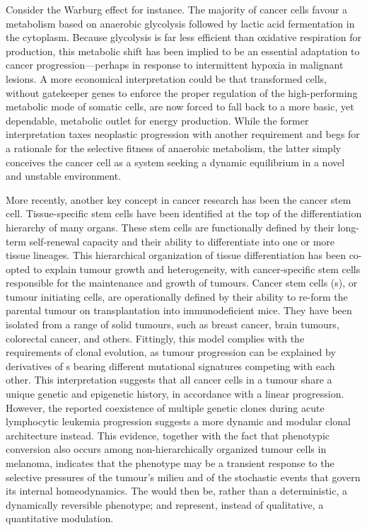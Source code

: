 Consider the Warburg effect\cite{warburg_origin_1956} for instance.  The
majority of cancer cells favour a metabolism based on anaerobic glycolysis
followed by lactic acid fermentation in the cytoplasm.  Because glycolysis is
far less efficient than oxidative respiration for  production,
this metabolic shift has been implied to be an essential adaptation to cancer
progression---perhaps in response to intermittent hypoxia in malignant
lesions.\cite{gatenby_why_2004} A more economical interpretation could be that
transformed cells, without gatekeeper genes to enforce the proper regulation of
the high-performing metabolic mode of somatic cells, are now forced to fall back
to a more basic, yet dependable, metabolic outlet for energy production.  While
the former interpretation taxes neoplastic progression with another requirement
and begs for a rationale for the selective fitness of anaerobic metabolism, the
latter simply conceives the cancer cell as a system seeking a dynamic
equilibrium in a novel and unstable environment.

More recently, another key concept in cancer research has been the cancer stem
cell.  Tissue-specific stem cells have been identified at the top of the
differentiation hierarchy of many organs.  These stem cells are functionally
defined by their long-term self-renewal capacity and their ability to
differentiate into one or more tissue lineages.  This hierarchical organization
of tissue differentiation has been co-opted to explain tumour growth and
heterogeneity, with cancer-specific stem cells responsible for the maintenance
and growth of tumours.  Cancer stem cells (s), or tumour initiating
cells, are operationally defined by their ability to re-form the parental tumour
on transplantation into immunodeficient mice.  They have been isolated from a
range of solid tumours, such as breast cancer, brain tumours, colorectal cancer,
and others.\cite{beck_unravelling_2013} Fittingly, this model complies with the
requirements of clonal evolution, as tumour progression can be explained by
derivatives of s bearing different mutational signatures competing
with each other.  This interpretation suggests that all cancer cells in a tumour
share a unique genetic and epigenetic history, in accordance with a linear
progression.  However, the reported coexistence of multiple genetic clones
during acute lymphocytic leukemia progression suggests a more dynamic and
modular clonal architecture
instead.\cite{anderson_genetic_2011,notta_evolution_2011} %
This evidence, together with the fact that phenotypic conversion also occurs
among non-hierarchically organized tumour cells in
melanoma,\cite{quintana_phenotypic_2010} indicates that the 
phenotype may be a transient response to the selective pressures of the tumour's
milieu and of the stochastic events that govern its internal
homeodynamics.\cite{visvader_cancer_2012,aktipis_life_2013} The 
would then be, rather than a deterministic, a dynamically reversible phenotype;
and represent, instead of qualitative, a quantitative
modulation.\cite{maenhaut_cancer_2010,tarabichi_systems_2013}

